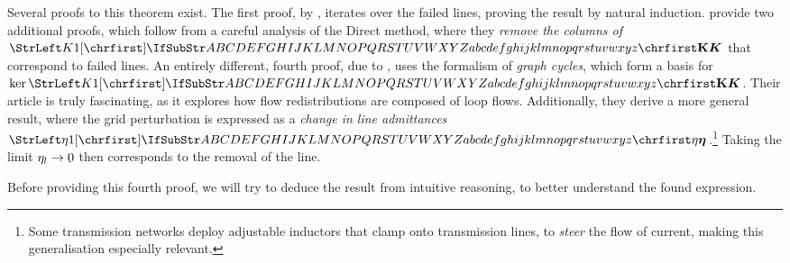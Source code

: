 \documentclass[main.tex]{subfiles}
\begin{document}
Several proofs to this theorem exist. The first proof, by \cite{Guler2007}, iterates over the failed lines, proving the result by natural induction. \citep{Guo2009} provide two additional proofs, which follow from a careful analysis of the Direct method, where they \emph{remove the columns of $\mat{K}$} that correspond to failed lines. An entirely different, fourth proof, due to \cite{Ronellenfitsch2017}, uses the formalism of \emph{graph cycles}, which form a basis for $\ker \mat{K}$. Their article is truly fascinating, as it explores how flow redistributions are composed of loop flows. Additionally, they derive a more general result, where the grid perturbation is expressed as a \emph{change in line admittances $\mat{\eta}$}.\footnote{Some transmission networks deploy adjustable inductors that clamp onto transmission lines, to \emph{steer} the flow of current, making this generalisation especially relevant.} Taking the limit ${\mathrm{\eta}}_l \rightarrow 0$ then corresponds to the removal of the line.

Before providing this fourth proof, we will try to deduce the result from intuitive reasoning, to better understand the found expression.
\end{document}
